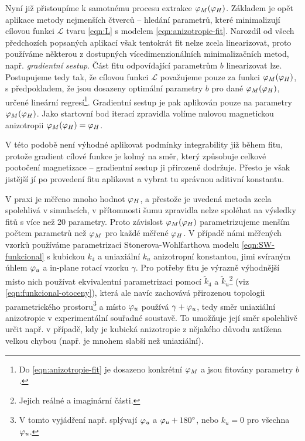 Nyní již přistoupíme k samotnému procesu extrakce $\varphi_M(\varphi_H)$.
Základem je opět aplikace metody nejmenších čtverců -- hledání parametrů, které minimalizují cílovou funkci $\mathcal{L}$ tvaru \eqref{eqn:L} s modelem \eqref{eqn:anizotropie-fit}.
Narozdíl od všech předchozích popsaných aplikací však tentokrát fit nelze zcela linearizovat, proto používáme některou z dostupných vícedimenzionálních minimalizačních metod, např. \emph{gradientní sestup}.
Část fitu odpovídající parametrům $b$ linearizovat lze.
Postupujeme tedy tak, že cílovou funkci $\mathcal{L}$ považujeme pouze za funkci $\varphi_M(\varphi_H)$, s předpokladem, že jsou dosazeny optimální parametry $b$ pro dané $\varphi_M(\varphi_H)$, určené lineární regresí\footnote{Do \eqref{eqn:anizotropie-fit} je dosazeno konkrétní $\varphi_M$ a jsou fitovány parametry $b$.}.
Gradientní sestup je pak aplikován pouze na parametry $\varphi_M(\varphi_H)$.
Jako startovní bod iterací zpravidla volíme nulovou magnetickou anizotropii $\varphi_M(\varphi_H)=\varphi_H$.

V této podobě není výhodné aplikovat podmínky integrability již během fitu, protože gradient cílové funkce je kolmý na směr, který způsobuje celkové pootočení magnetizace -- gradientní sestup ji přirozeně dodržuje.
Přesto je však jistější jí po provedení fitu aplikovat a vybrat tu správnou aditivní konstantu.

V praxi je měřeno mnoho hodnot $\varphi_H$, a přestože je uvedená metoda zcela spolehlivá v simulacích, v přítomnosti šumu zpravidla nelze spoléhat na výsledky fitů s více než 20 parametry.
Proto závislost $\varphi_M(\varphi_H)$ parametrizujeme menším počtem parametrů než $\varphi_M$ pro každé měřené $\varphi_H$.
V případě námi měřených vzorků používáme parametrizaci Stonerova-Wohlfarthova modelu \eqref{eqn:SW-funkcional} s kubickou $k_4$ a uniaxiální $k_u$ anizotropní konstantou, jimi svíraným úhlem $\varphi_u$ a in-plane rotací vzorku $\gamma$.
Pro potřeby fitu je výrazně výhodnější místo nich používat ekvivalentní parametrizaci pomocí $\tilde{k}_4$ a $\tilde{k}_u$\footnote{Jejich reálné a imaginární části.} (viz \eqref{eqn:funkcional-otoceny}), která ale navíc zachovává přirozenou topologii parametrického prostoru\footnote{V tomto vyjádření např. splývají $\varphi_u$ a $\varphi_u+\SI{180}{\degree}$, nebo $k_u=0$ pro všechna $\varphi_u$.} a místo $\varphi_u$ používá $\gamma+\varphi_u$, tedy směr uniaxiální anizotropie v experimentální souřadné soustavě.
To umožňuje její směr spolehlivě určit např. v případě, kdy je kubická anizotropie z nějakého důvodu zatížena velkou chybou (např. je mnohem slabší než uniaxiální).

